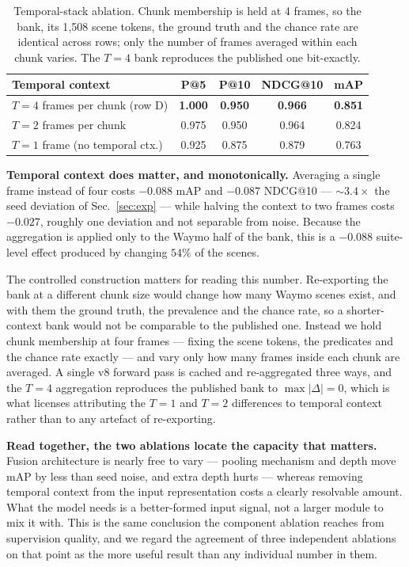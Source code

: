 \documentclass[10pt,twocolumn,letterpaper]{article}
\begin{document}
\begin{table}[t]\centering\footnotesize
\setlength{\tabcolsep}{3pt}
\begin{tabular}{lcccc}
\toprule
Temporal context & P@5 & P@10 & NDCG@10 & mAP \\
\midrule
$T{=}4$ frames per chunk (row D) & \textbf{1.000} & \textbf{0.950} & \textbf{0.966} & \textbf{0.851} \\
$T{=}2$ frames per chunk         & 0.975 & 0.950 & 0.964 & 0.824 \\
$T{=}1$ frame (no temporal ctx.) & 0.925 & 0.875 & 0.879 & 0.763 \\
\bottomrule
\end{tabular}
\caption{Temporal-stack ablation. Chunk membership is held at 4 frames, so
the bank, its 1{,}508 scene tokens, the ground truth and the chance rate are
identical across rows; only the number of frames averaged within each chunk
varies. The $T{=}4$ bank reproduces the published one bit-exactly.}
\label{tab:temporal}
\end{table}

\noindent\textbf{Temporal context does matter, and monotonically.} Averaging
a single frame instead of four costs $-0.088$ mAP and $-0.087$ NDCG@10 ---
${\sim}3.4\times$ the seed deviation of Sec.~\ref{sec:exp} --- while halving
the context to two frames costs $-0.027$, roughly one deviation and not
separable from noise. Because the aggregation is applied only to the Waymo
half of the bank, this is a $-0.088$ suite-level effect produced by changing
$54\%$ of the scenes.

The controlled construction matters for reading this number. Re-exporting
the bank at a different chunk size would change how many Waymo scenes exist,
and with them the ground truth, the prevalence and the chance rate, so a
shorter-context bank would not be comparable to the published one. Instead we
hold chunk membership at four frames --- fixing the scene tokens, the
predicates and the chance rate exactly --- and vary only how many frames
inside each chunk are averaged. A single v8 forward pass is cached and
re-aggregated three ways, and the $T{=}4$ aggregation reproduces the
published bank to $\max|\Delta| = 0$, which is what licenses attributing the
$T{=}1$ and $T{=}2$ differences to temporal context rather than to any
artefact of re-exporting.

\noindent\textbf{Read together, the two ablations locate the capacity that
matters.} Fusion architecture is nearly free to vary --- pooling mechanism and
depth move mAP by less than seed noise, and extra depth hurts --- whereas
removing temporal context from the input representation costs a clearly
resolvable amount. What the model needs is a better-formed input signal, not
a larger module to mix it with. This is the same conclusion the component
ablation reaches from supervision quality, and we regard the agreement of
three independent ablations on that point as the more useful result than any
individual number in them.
\end{document}
